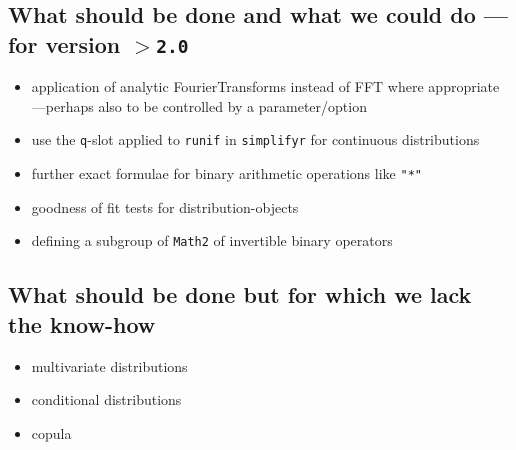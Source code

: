 \documentclass[11pt]{article}
\newcommand{\code}[1]{{\tt #1}}
\newcommand{\pkgversion}{{\tt 2.0}}
\begin{document}
\subsection[What should be done and what we could do]%
{What should be done and what we could do ---for version $>$\pkgversion}
\begin{itemize}
\item application of analytic FourierTransforms instead of FFT where
appropriate ---perhaps also to be controlled
by a parameter/option
\item use the \code{q}-slot applied to \code{runif} in \code{simplifyr}
for continuous distributions
\item further exact formulae for binary arithmetic operations like \code{"*"}
\item goodness of fit tests for distribution-objects
\item defining a subgroup of \code{Math2} of invertible binary operators
\end{itemize}
\subsection{What should be done but for which we lack the know-how}
\begin{itemize}
  \item multivariate distributions
  \item conditional distributions
  \item copula
\end{itemize}
%
\end{document}
